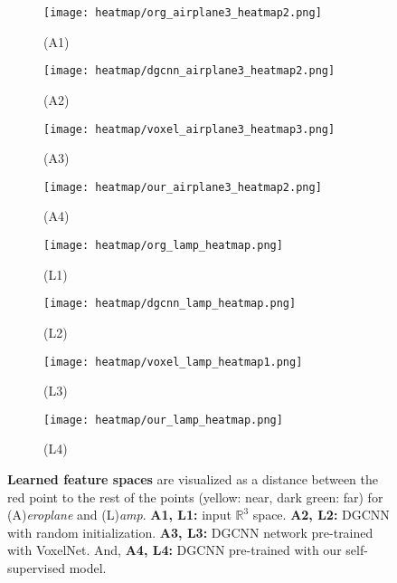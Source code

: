 \documentclass{article}
\begin{document}
\begin{figure}[h]
	\centering
    	\begin{subfigure}{.45\textwidth}
		\centering
		\texttt{[image: heatmap/org\_airplane3\_heatmap2.png]}
		\caption*{(A1)}
		\label{fig:sub13}
    \end{subfigure}\begin{subfigure}{.45\textwidth}
		\centering
		\texttt{[image: heatmap/dgcnn\_airplane3\_heatmap2.png]}
		\caption*{(A2)}
		\label{fig:sub14}
    \end{subfigure}
    \begin{subfigure}{.45\textwidth}
		\centering
		\texttt{[image: heatmap/voxel\_airplane3\_heatmap3.png]}
		\caption*{(A3)}
		\label{fig:sub15}
	\end{subfigure}\begin{subfigure}{.45\textwidth}
		\centering
		\texttt{[image: heatmap/our\_airplane3\_heatmap2.png]}
		\caption*{(A4)}
		\label{fig:sub16}
    \end{subfigure}
    	\begin{subfigure}{.45\textwidth}
		\centering
		\texttt{[image: heatmap/org\_lamp\_heatmap.png]}
		\caption*{(L1)}
		\label{fig:sub9}
	\end{subfigure}\begin{subfigure}{.45\textwidth}
		\centering
		\texttt{[image: heatmap/dgcnn\_lamp\_heatmap.png]}
		\caption*{(L2)}
		\label{fig:sub10}
    \end{subfigure}
    \begin{subfigure}{.45\textwidth}
		\centering
		\texttt{[image: heatmap/voxel\_lamp\_heatmap1.png]}
		\caption*{(L3)}
		\label{fig:sub11}
	\end{subfigure}\begin{subfigure}{.45\textwidth}
		\centering
		\texttt{[image: heatmap/our\_lamp\_heatmap.png]}
		\caption*{(L4)}
		\label{fig:sub12}
	\end{subfigure}
\caption{\textbf{Learned feature spaces} are visualized as a distance between the red point to the rest of the points (yellow: near, dark green: far) for (A)\emph{eroplane} and (L)\emph{amp}. \textbf{A1, L1:} input $\mathbb{R}^{3}$ space. \textbf{A2, L2:} DGCNN with random initialization. \textbf{A3, L3:} DGCNN network pre-trained with VoxelNet. And, \textbf{A4, L4:} DGCNN pre-trained with our self-supervised model.}
	\label{fig:heatmap_supp1}
\end{figure}
\end{document}
